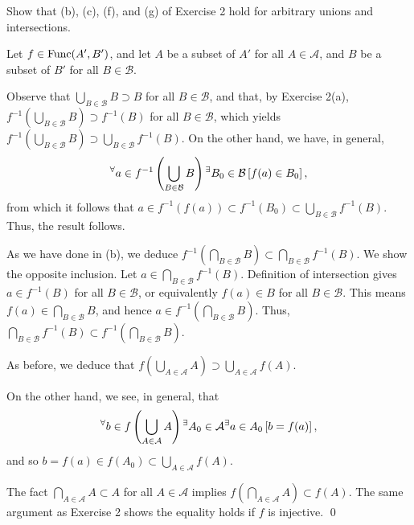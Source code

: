 \documentclass[a4paper,12pt]{article}
\begin{document}
\begin{exe}
	Show that (b), (c), (f), and (g) of Exercise 2 hold for arbitrary unions and intersections.
\end{exe}\begin{sol}
	Let
	\( f \in \mathrm{Func}(A',B') \),
	and let
	\( A \)
	be a subset of
	\( A' \)
	for all
	\( A \in \mathcal{A} \),
	and 
	\( B\)
	be a subset of
	\( B' \)
	for all
	\( B \in \mathcal{B} \).
	
	Observe that
	\( \bigcup_{B \in \mathcal{B}} B \supset B\)
	for all 
	\( B \in \mathcal{B} \),
	and that, by Exercise 2(a),
	\(f^{-1} \left( \bigcup_{B \in \mathcal{B}} B \right)
	\supset f^{-1} \left( B \right)\)
	for all 
	\( B \in \mathcal{B} \),
	which yields
	\(f^{-1} \left( \bigcup_{B \in \mathcal{B}} B \right)
	\supset 
	\bigcup_{B \in \mathcal{B}} f^{-1} \left( B \right)\).
	On the other hand, we have, in general, 
	\begin{equation*}
		\Forall{a\in
			f^{-1} \left( \bigcup_{B \in \mathcal{B}} B \right)
		}
		\Exists{B_0 \in \mathcal{B}}
		\left[ f(a)\in B_0 \right],
	\end{equation*}
	from which it follows that
	\(
	a \in f^{-1} \left( f(a) \right)
	\subset
	f ^{-1}(B_0)
	\subset
	\bigcup_{B \in \mathcal{B}} f ^{-1} \left( B \right).
	\)
	Thus, the result follows.
	
	As we have done in (b), we deduce
	\(f^{-1} \left( \bigcap_{B \in \mathcal{B}} B \right)
	\subset 
	\bigcap_{B \in \mathcal{B}} f^{-1} \left(  B \right)
	\).
	We show the opposite inclusion.
	Let
	\(a \in \bigcap_{B \in \mathcal{B}} f^{-1} \left(  B \right)\).
	Definition of intersection gives
	\(a \in f^{-1} \left(  B \right)\)
	for all
	\(B \in \mathcal{B}\),
	or equivalently
	\(f(a) \in B\)
	for all
	\(B \in \mathcal{B}\).
	This means
	\( f(a) \in \bigcap_{B \in \mathcal{B}} B \),
	and hence
	\( a \in f^{-1} \left( \bigcap_{B \in \mathcal{B}} B \right) \).
	Thus,
	\(
	\bigcap_{B \in \mathcal{B}} f^{-1} \left(  B \right)
	\subset 
	f^{-1} \left( \bigcap_{B \in \mathcal{B}} B \right)
	\).
	
	As before, we deduce that 
	\(f \left( \bigcup_{A \in \mathcal{A}} A \right)
	\supset 
	\bigcup_{A \in \mathcal{A}} f \left(  A \right)
	\).
	
	On the other hand,
	we see, in general, that  
	\begin{equation*}
		\Forall{b \in
			f \left(\bigcup_{A \in \mathcal{A}} A \right)
		}
		\Exists{ A_0 \in \mathcal{A} }
		\Exists{ a \in A_0 }
		\left[ b = f(a) \right],
	\end{equation*}
	and so
	\(b = f(a) \in f(A_0) \subset \bigcup_{A \in \mathcal{A}} f \left(  A \right)\).
	
	The fact
	\(\bigcap_{A \in \mathcal{A}} A \subset A\)
	for all
	\(A \in \mathcal{A}\)
	implies 
	\(f \left( \bigcap_{A \in \mathcal{A}} A \right)
	\subset 
	f \left(  A \right)
	\).
	The same argument as Exercise 2 shows the equality holds
	if \( f \) is injective.
	\qed\end{sol}
\end{document}
